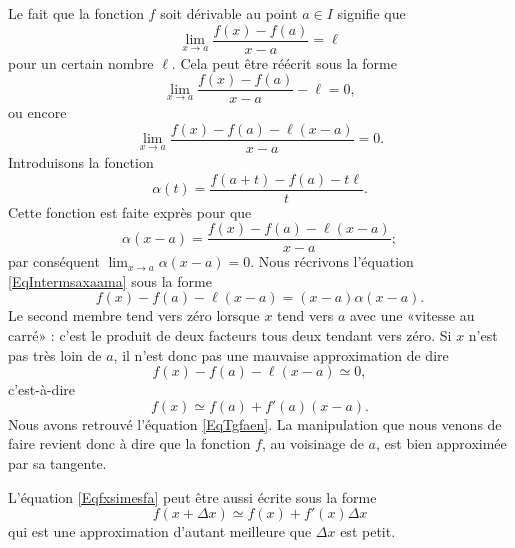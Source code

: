 Le fait que la fonction \( f\) soit dérivable au point \( a\in I\) signifie que
\begin{equation}
	\lim_{x\to a} \frac{ f(x)-f(a) }{ x-a }=\ell
\end{equation}
pour un certain nombre \( \ell\). Cela peut être réécrit sous la forme
\begin{equation}
	\lim_{x\to a} \frac{ f(x)-f(a) }{ x-a }-\ell=0,
\end{equation}
ou encore
\begin{equation}
	\lim_{x\to a} \frac{ f(x)-f(a)-\ell(x-a) }{ x-a }=0.
\end{equation}
Introduisons la fonction
\begin{equation}
	\alpha(t)=\frac{ f(a+t)-f(a)-t\ell }{ t }.
\end{equation}
Cette fonction est faite exprès pour que
\begin{equation}		\label{EqIntermsaxaama}
	\alpha(x-a)=\frac{ f(x)-f(a)-\ell(x-a) }{ x-a };
\end{equation}
par conséquent \( \lim_{x\to a} \alpha(x-a)=0\). Nous récrivons l'équation \eqref{EqIntermsaxaama} sous la forme
\begin{equation}        \label{EqCodeDerviffxam}
	f(x)-f(a)-\ell(x-a)=(x-a)\alpha(x-a).
\end{equation}
Le second membre tend vers zéro lorsque \( x\) tend vers \( a\) avec une «vitesse au carré» : c'est le produit de deux facteurs tous deux tendant vers zéro. Si \( x\) n'est pas très loin de \( a\), il n'est donc pas une mauvaise approximation de dire
\begin{equation}
	f(x)-f(a)-\ell(x-a)\simeq 0,
\end{equation}
c'est-à-dire
\begin{equation}		\label{Eqfxsimesfa}
	f(x)\simeq f(a)+f'(a)(x-a).
\end{equation}
Nous avons retrouvé l'équation \eqref{EqTgfaen}. La manipulation que nous venons de faire revient donc à dire que la fonction \( f\), au voisinage de \( a\), est bien approximée par sa tangente.

L'équation \eqref{Eqfxsimesfa} peut être aussi écrite sous la forme
\begin{equation}		\label{EqfxdxSimeqfxfpx}
	f(x+\Delta x)\simeq f(x)+f'(x)\Delta x
\end{equation}
qui est une approximation d'autant meilleure que \( \Delta x\) est petit.
